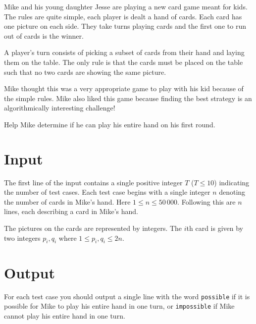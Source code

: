 

%

Mike and his young daughter Jesse are playing a new card game meant for kids.
The rules are quite simple, each player is dealt a hand of cards.
Each card has one picture on each side. They take turns playing cards
and the first one to run out of cards is the winner.

A player's turn consists of picking a subset of cards from their hand
and laying them on the table. The only rule is that the cards must be
placed on the table such that no two cards are showing the same picture.

Mike thought this was a very appropriate game to play with his kid because
of the simple rules. Mike also liked this game because finding the best
strategy is an algorithmically interesting challenge!

Help Mike determine if he can play his entire hand on his first round.

\section*{Input}

The first line of the input contains a single positive integer $T$ ($T \leq 10$) indicating
the number of test cases.
Each test case begins with a single integer
$n$ denoting the number of cards in Mike's hand. Here $1 \leq n \leq 50\,000$.
Following this are $n$ lines, each describing a card in Mike's hand.

The pictures on the cards are represented by integers.
The $i$th card is given by two integers $p_i, q_i$ where
$1 \leq p_i, q_i \leq 2n$.

\section*{Output}

For each test case you should output a single line
with the word \texttt{possible} if it is possible for Mike to play
his entire hand in one turn, or \texttt{impossible} if Mike cannot play
his entire hand in one turn.

